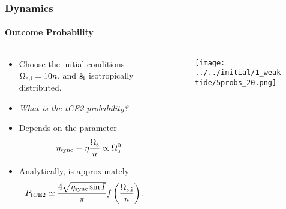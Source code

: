 \documentclass[dvipsnames, 9pt]{beamer}
\newcommand*{\bm}[1]{\boldsymbol{\mathbf{#1}}}
\newcommand*{\uv}[1]{\hat{\bm{#1}}}
\newcommand*{\p}[1]{\left(#1\right)}
\begin{document}
\begin{frame}
    \frametitle{Dynamics}
    \framesubtitle{Outcome Probability}
    \begin{columns}
        \begin{column}{0.5\columnwidth}
            \begin{itemize}
                \item Choose the initial conditions $\Omega_{\rm s, i} = 10n$,
                    and $\uv{s}_{\rm i}$ isotropically distributed.

                \item \emph{What is the tCE2 probability?}

                \item Depends on the parameter
                    \begin{equation*}
                        \eta_{\rm sync} \equiv \eta \frac{\Omega_{\rm s}}{n}
                            \propto \Omega_{\rm s}^0
                    \end{equation*}

                \item Analytically, is approximately
                \begin{align}
                    P_{\rm tCE2} &\simeq
                            \frac{4\sqrt{\eta _{\rm sync} \sin I}}{\pi}
                                f\p{\frac{\Omega_{\rm s, i}}{n}}.
                \end{align}
            \end{itemize}
        \end{column}
        \begin{column}{0.5\columnwidth}
            \begin{figure}
                \centering
                \texttt{[image: ../../initial/1\_weaktide/5probs\_20.png]}
            \end{figure}
        \end{column}
    \end{columns}
\end{frame}
\end{document}
